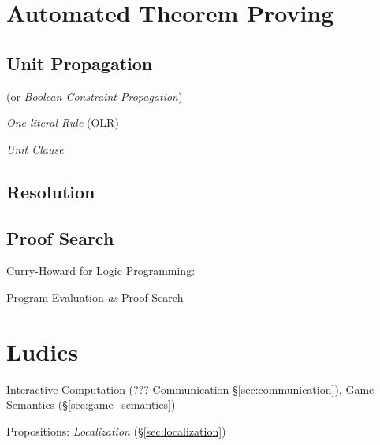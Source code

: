 \section{Automated Theorem Proving}\label{sec:atp}

\subsection{Unit Propagation}\label{sec:unit_propagation}

(or \emph{Boolean Constraint Propagation})

\emph{One-literal Rule} (OLR)

\emph{Unit Clause}



\subsection{Resolution}\label{sec:resolution}

\subsection{Proof Search}\label{sec:proof_search}

Curry-Howard for Logic Programming: \cite{wadler12}

Program Evaluation \emph{as} Proof Search



\section{Ludics} \label{sec:ludics}

\cite{girard01}

Interactive Computation (??? Communication \S\ref{sec:communication}),
Game Semantics (\S\ref{sec:game_semantics})

Propositions: \emph{Localization} (\S\ref{sec:localization})


